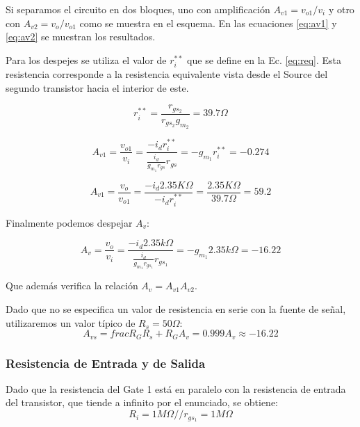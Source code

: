\documentclass[a4paper, 10pt, spanish]{article}
\begin{document}
Si separamos el circuito en dos bloques, uno con amplificación $A_{v1}=v_{o1}/v_i$ y otro con $A_{v2}=v_o/v_{o1}$ como se muestra en el esquema. En las ecuaciones \ref{eq:av1} y \ref{eq:av2} se muestran los resultados.

Para los despejes se utiliza el valor de $r_i^{**}$ que se define en la Ec. \ref{eq:req}. Esta resistencia corresponde a la resistencia equivalente vista desde el Source del segundo transistor hacia el interior de este.

\begin{equation}
  r_i^{**}=\frac{r_{gs_2}}{r_{gs_2} g_{m_2}} = 39.7 \Omega
  \label{eq:req}
\end{equation}

\begin{equation}
  A_{v1}=\frac{v_{o1}}{v_i}=\frac{-i_d r_i^{**}}{\frac{i_d}{g_{m_1} r_{gs}}r_{gs}}=-g_{m_1} r_i^{**} = -0.274
  \label{eq:av1}
\end{equation}

\begin{equation}
  A_{v1}=\frac{v_{o}}{v_{o1}}=\frac{-i_d 2.35K\Omega}{-i_d r_i^{**}}=\frac{2.35K\Omega}{39.7\Omega} = 59.2
  \label{eq:av2}
\end{equation}

Finalmente podemos despejar $A_v$:

\begin{equation}
  A_v=\frac{v_o}{v_i}=\frac{-i_d 2.35k\Omega}{\frac{i_d}{ g_{m_1} r_{gs_1} } r_{gs_1} } = -g_{m_1} 2.35k\Omega = -16.22
  \label{eq:av}
\end{equation}

Que además verifica la relación $A_v = A_{v1} A_{v2}$.

Dado que no se especifica un valor de resistencia en serie con la fuente de señal, utilizaremos un valor típico de $R_s=50\Omega$:
\begin{equation}
  A_{vs}=frac{R_G}{R_s+R_G}A_{v} = 0.999 A_v \approx -16.22
\end{equation}


\subsubsection{Resistencia de Entrada y de Salida}
Dado que la resistencia del Gate 1 está en paralelo con la resistencia de entrada del transistor, que tiende a infinito por el enunciado, se obtiene:
\begin{equation}
  R_i=1M\Omega // r_{gs_1} = 1M\Omega
\end{equation}
\end{document}

